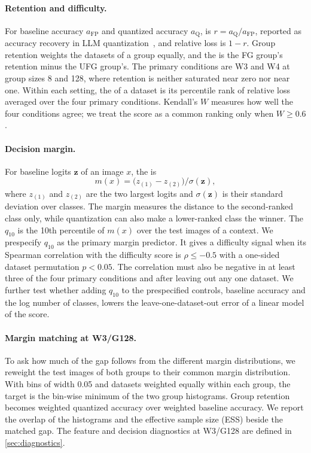 \paragraph{Retention and difficulty.}
For baseline accuracy $a_{\mathrm{FP}}$ and quantized accuracy $a_{\mathrm{Q}}$,  is $r = a_{\mathrm{Q}} / a_{\mathrm{FP}}$, reported as accuracy recovery in LLM quantization~\cite{kurtic2025bf16}, and relative loss is $1-r$.
Group retention weights the datasets of a group equally, and the  is the FG group's retention minus the UFG group's.
The primary conditions are W3 and W4 at group sizes 8 and 128, where retention is neither saturated near zero nor near one.
Within each setting, the  of a dataset is its percentile rank of relative loss averaged over the four primary conditions.
Kendall's $W$ measures how well the four conditions agree; we treat the score as a common ranking only when $W \ge 0.6$.

\paragraph{Decision margin.}
For baseline logits $\bm{z}$ of an image $x$, the  is
\begin{equation}
  m(x) = \bigl(z_{(1)} - z_{(2)}\bigr) / \sigma(\bm{z}),
  \label{eq:margin}
\end{equation}
where $z_{(1)}$ and $z_{(2)}$ are the two largest logits and $\sigma(\bm{z})$ is their standard deviation over classes.
The margin measures the distance to the second-ranked class only, while quantization can also make a lower-ranked class the winner.
The  $q_{10}$ is the 10th percentile of $m(x)$ over the test images of a context.
We prespecify $q_{10}$ as the primary margin predictor.
It gives a difficulty signal when its Spearman correlation with the difficulty score is $\rho \le -0.5$ with a one-sided dataset permutation $p < 0.05$.
The correlation must also be negative in at least three of the four primary conditions and after leaving out any one dataset.
We further test whether adding $q_{10}$ to the prespecified controls, baseline accuracy and the log number of classes, lowers the leave-one-dataset-out error of a linear model of the score.

\paragraph{Margin matching at W3/G128.}
To ask how much of the gap follows from the different margin distributions, we reweight the test images of both groups to their common margin distribution.
With bins of width 0.05 and datasets weighted equally within each group, the target is the bin-wise minimum of the two group histograms.
Group retention becomes weighted quantized accuracy over weighted baseline accuracy.
We report the overlap of the histograms and the effective sample size (ESS) beside the matched gap.
The feature and decision diagnostics at W3/G128 are defined in \cref{sec:diagnostics}.
